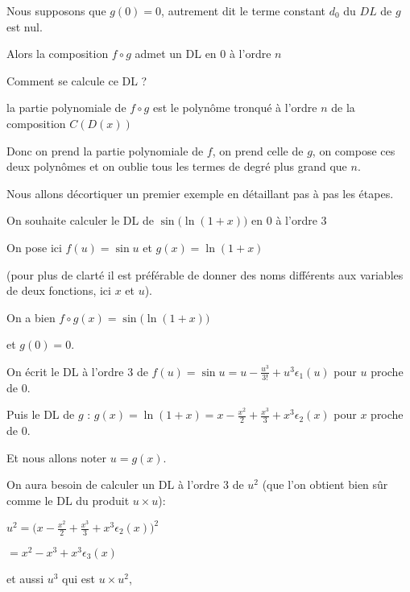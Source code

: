 \change 

Nous supposons que $g(0)=0$, autrement dit le terme constant $d_0$ du $DL$ de $g$ est nul.

Alors la composition $f\circ g$ admet un DL en $0$ à l'ordre $n$

\change

Comment se calcule ce DL ?

la partie polynomiale de $f\circ g$ est
le polynôme tronqué à l'ordre $n$ de la composition $C(D(x))$

Donc on prend la partie polynomiale de $f$, on prend celle de $g$, on compose ces deux polynômes
et on oublie tous les termes de degré plus grand que $n$.

\diapo

Nous allons décortiquer un premier exemple en détaillant pas à pas les étapes.

On souhaite calculer le DL de $\sin\big(\ln(1+x)\big)$ en $0$ à l'ordre $3$

\change

On pose ici $f(u)=\sin u$ et $g(x)=\ln(1+x)$ 

(pour plus de clarté il est préférable de donner des noms différents aux variables de deux fonctions,
 ici $x$ et $u$).

\change 

On a bien $f\circ g(x) = \sin\big(\ln(1+x)\big)$ 

\change

et $g(0)=0$.

\change 

On écrit le DL à l'ordre 3 de $f(u)=\sin u = u-\frac{u^3}{3!}+u^3\epsilon_1(u)$ pour $u$ proche de $0$.

\change 

Puis le DL de $g$ : $g(x)=\ln(1+x)=x-\frac{x^2}{2}+\frac{x^3}{3}+x^3\epsilon_2(x)$ pour $x$ proche de $0$. 

Et nous allons noter $u=g(x)$.

\change

On aura besoin de calculer un DL à l'ordre 3 de $u^2$ 
(que l'on obtient bien sûr comme le DL du produit
 $u\times u$):

$u^2 = \big(x-\frac{x^2}{2}+\frac{x^3}{3}+x^3\epsilon_2(x)\big)^2$

\change

$ = x^2-x^3+x^3\epsilon_3(x)$

\change 

et aussi $u^3$ qui est $u \times u^2$, 

